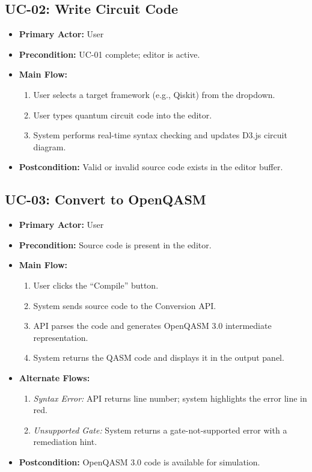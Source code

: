 \subsection{UC-02: Write Circuit Code}
\begin{itemize}
    \item \textbf{Primary Actor:} User
    \item \textbf{Precondition:} UC-01 complete; editor is active.
    \item \textbf{Main Flow:}
    \begin{enumerate}
        \item User selects a target framework (e.g., Qiskit) from the dropdown.
        \item User types quantum circuit code into the editor.
        \item System performs real-time syntax checking and updates D3.js circuit diagram.
    \end{enumerate}
    \item \textbf{Postcondition:} Valid or invalid source code exists in the editor buffer.
\end{itemize}

\subsection{UC-03: Convert to OpenQASM}
\begin{itemize}
    \item \textbf{Primary Actor:} User
    \item \textbf{Precondition:} Source code is present in the editor.
    \item \textbf{Main Flow:}
    \begin{enumerate}
        \item User clicks the ``Compile'' button.
        \item System sends source code to the Conversion API.
        \item API parses the code and generates OpenQASM 3.0 intermediate representation.
        \item System returns the QASM code and displays it in the output panel.
    \end{enumerate}
    \item \textbf{Alternate Flows:}
    \begin{enumerate}
        \item [3a] \textit{Syntax Error:} API returns line number; system highlights the error line in red.
        \item [3b] \textit{Unsupported Gate:} System returns a gate-not-supported error with a remediation hint.
    \end{enumerate}
    \item \textbf{Postcondition:} OpenQASM 3.0 code is available for simulation.
\end{itemize}

